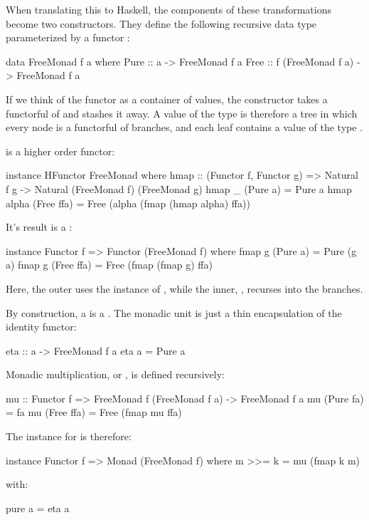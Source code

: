 \documentclass[DaoFP]{subfiles}
\begin{document}
When translating this to Haskell, the components of these transformations become two constructors. They define the following recursive data type parameterized by a functor :
\begin{haskell}
data FreeMonad f a where
   Pure :: a -> FreeMonad f a
   Free :: f (FreeMonad f a) -> FreeMonad f a
\end{haskell}

If we think of the functor  as a container of values, the constructor  takes a functorful of  and stashes it away. A value of the type  is therefore a tree in which every node is a functorful of branches, and each leaf contains a value of the type .

 is a higher order functor:
\begin{haskell}
instance HFunctor FreeMonad where
   hmap :: (Functor f, Functor g) =>
      Natural f g -> Natural (FreeMonad f) (FreeMonad g)
   hmap _ (Pure a) = Pure a
   hmap alpha (Free ffa) = Free (alpha (fmap (hmap alpha) ffa))
\end{haskell}

It's result is a :
\begin{haskell}
instance Functor f => Functor (FreeMonad f) where
  fmap g (Pure a) = Pure (g a)
  fmap g (Free ffa) = Free (fmap (fmap g) ffa)
\end{haskell}
Here, the outer  uses the  instance of , while the inner, , recurses into the branches.

By construction, a  is a . The monadic unit  is just a thin encapsulation of the identity functor:
\begin{haskell}
eta :: a -> FreeMonad f a
eta a = Pure a
\end{haskell}

Monadic multiplication, or , is defined recursively:
\begin{haskell}
mu :: Functor f => FreeMonad f (FreeMonad f a) -> FreeMonad f a
mu (Pure fa) = fa
mu (Free ffa) = Free (fmap mu ffa)
\end{haskell}

The  instance for  is therefore:
\begin{haskell}
instance Functor f => Monad (FreeMonad f) where
  m >>= k = mu (fmap k m)
\end{haskell}
with:
\begin{haskell}
  pure a = eta a
\end{haskell}
\end{document}
